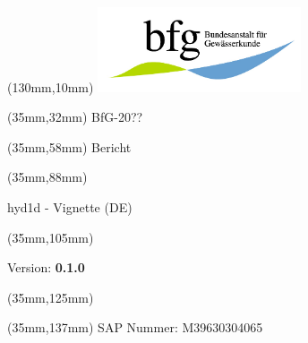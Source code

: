 \begin{titlepage}
    \begin{textblock*}{50mm}(130mm,10mm)
    \includegraphics[width=6cm]{latex/bfg_logo.jpg} %
    \end{textblock*}

    \begin{textblock*}{150mm}(35mm,32mm)
    \huge\noindent
    BfG-20??
    \end{textblock*}

    \begin{textblock*}{150mm}(35mm,58mm)
    \fontsize{30}{35}\selectfont\noindent
    Bericht
    \end{textblock*}

    \begin{textblock*}{150mm}(35mm,88mm)
    \fontsize{20}{25}\selectfont\noindent
    \begin{center}
    hyd1d - Vignette (DE)
    \end{center}
    \end{textblock*}

    \begin{textblock*}{150mm}(35mm,105mm)
    \fontsize{15}{17}\selectfont\noindent
    \begin{center}
    Version: \textbf{0.1.0}
    \end{center}
    \end{textblock*}

    \begin{textblock*}{150mm}(35mm,125mm)
    \fontsize{15}{17}\selectfont\noindent
    \mytoday
    \end{textblock*}


    \begin{textblock*}{150mm}(35mm,137mm)
    \fontsize{15}{17}\selectfont\noindent
    SAP Nummer: M39630304065
    \end{textblock*}


\end{titlepage}
